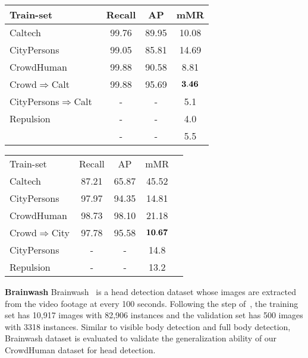 \documentclass[10pt,twocolumn,letterpaper]{article}
\newcommand{\myparagraph}[1]{{\vspace{0.5em} \noindent \bf #1}}
\begin{document}
\begin{table*}
\parbox{.5\linewidth}{
\centering
\caption{Experimental results on Caltech dataset.}
\label{table:evalCaltech}
\begin{tabular}{lccc}
\hline
Train-set & Recall & AP & mMR\\
\hline
Caltech & {99.76}  & {89.95} & {10.08}\\
CityPersons & {99.05} & {85.81} & {14.69}\\
CrowdHuman & {99.88} & {90.58} & {8.81}\\
Crowd$\Rightarrow$Calt & {99.88} & {95.69} & {$\bf{3.46}$}\\
\hline
\hline
CityPersons$\Rightarrow$Calt~\cite{zhang2017citypersons} & - & - & {5.1}\\
Repulsion~\cite{wang2018Repulsion} & - & - & {4.0}\\
\cite{mao2017can} & - & - & {5.5}\\
\hline
\end{tabular}
}
\hfill
\parbox{.5\linewidth}{
\centering
\caption{Experimental reslts on CityPersons.}
\label{table:evalCity}
\begin{tabular}{lcccc}
\hline\noalign{\smallskip}
Train-set & Recall & AP & mMR\\
\noalign{\smallskip}
\hline
\noalign{\smallskip}
Caltech  & {87.21}  & {65.87} & {45.52}\\
CityPersons & {97.97} & {94.35} & {14.81}\\
CrowdHuman & {98.73} & {98.10} & {21.18}\\
Crowd$\Rightarrow$City & {97.78} & {95.58} & {$\bf{10.67}$}\\
\hline
\hline
CityPersons~\cite{zhang2017citypersons} & - & - & {14.8}\\
Repulsion~\cite{wang2018Repulsion} & - & - & {13.2}\\
\hline
\end{tabular}
}
\end{table*}



\myparagraph{Brainwash} Brainwash~\cite{stewart2016end} is a head detection dataset whose images are extracted from the video footage at every 100 seconds. Following the step of~\cite{stewart2016end}, the training set has 10,917 images with 82,906 instances and the validation set has 500 images with 3318 instances. Similar to visible body detection and full body detection, Brainwash dataset is evaluated to validate the generalization ability of our CrowdHuman dataset for head detection.
\end{document}
